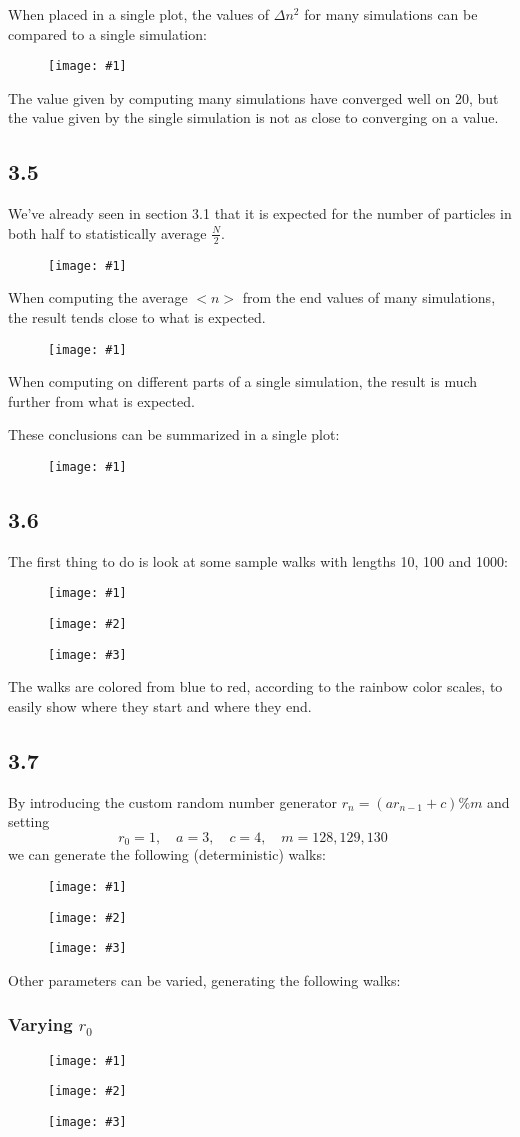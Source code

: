 \documentclass[11pt]{article}
\newcommand{\triplefigure}[3]{
\begin{figure}[H]
  \centering
  \begin{minipage}{0.3\textwidth}
    \centering
    \texttt{[image: \#1]}
  \end{minipage}
  \begin{minipage}{0.3\textwidth}
    \centering
    \texttt{[image: \#2]}
  \end{minipage}
  \begin{minipage}{0.3\textwidth}
    \centering
    \texttt{[image: \#3]}
  \end{minipage}
\end{figure}
}
\newcommand{\singlefigure}[1]{
\begin{figure}[H]
  \centering
  \begin{minipage}{0.4\textwidth}
    \centering
    \texttt{[image: \#1]}
  \end{minipage}
\end{figure}
}
\begin{document}
When placed in a single plot, the values of $\Delta n^2$ for many simulations can be compared to a single simulation:
\singlefigure{./plots/3_4/comparison.png}

The value given by computing many simulations have converged well on 20, but the value given by the single simulation is not as close to converging on a value.

\subsection*{3.5}
We've already seen in section 3.1 that it is expected for the number of particles in both half to statistically average $\frac{N}{2}$. 

\singlefigure{./plots/3_5/many.png}
When computing the average $<n>$ from the end values of many simulations, the result tends close to what is expected.

\singlefigure{./plots/3_5/single.png}
When computing on different parts of a single simulation, the result is much further from what is expected.

These conclusions can be summarized in a single plot:
\singlefigure{./plots/3_5/comparison.png}

\subsection*{3.6}
The first thing to do is look at some sample walks with lengths 10, 100 and 1000:
\triplefigure{./plots/3_6/randomwalk_10.png}{./plots/3_6/randomwalk_100.png}{./plots/3_6/randomwalk_1000.png}

The walks are colored from blue to red, according to the rainbow color scales, to easily show where they start and where they end.

\subsection*{3.7}
By introducing the custom random number generator $r_n = (a r_{n-1} + c) \% m$ and setting
$$
r_0 = 1, \quad
a = 3, \quad
c = 4, \quad
m = 128, 129, 130 \quad
$$
we can generate the following (deterministic) walks:
\triplefigure{./plots/3_7/randomwalk_1000_r1_a3_c4_m128.png}{./plots/3_7/randomwalk_1000_r1_a3_c4_m129.png}{./plots/3_7/randomwalk_1000_r1_a3_c4_m130.png}

Other parameters can be varied, generating the following walks:
\subsubsection*{Varying $r_0$}
\triplefigure{./plots/3_7/randomwalk_1000_r1_a3_c4_m128.png}{./plots/3_7/randomwalk_1000_r2_a3_c4_m128.png}{./plots/3_7/randomwalk_1000_r3_a3_c4_m128.png}
\end{document}
